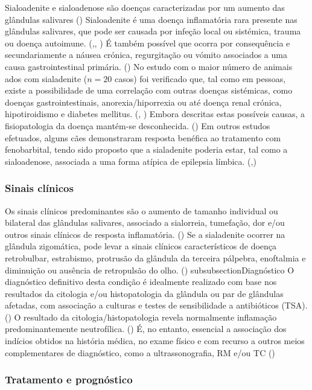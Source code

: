 Sialoadenite e sialoadenose são doenças caracterizadas por um aumento das glândulas salivares (\cite{Enache2025}) Sialoadenite é uma doença inflamatória rara presente nas glândulas salivares, que pode ser causada por infeção local ou sistémica, trauma ou doença autoimune. (\cite{supurativa},\cite{11cases}, \cite{sialadenite}) É também possível que ocorra por consequência e secundariamente a náusea crónica, regurgitação ou vómito associados a uma causa gastrointestinal primária. (\cite{McGill2009}) No estudo com o maior número de animais \cite{Kumar2017}ados com sialadenite ($n=20$ casos) foi verificado que, tal como em pessoas, existe a possibilidade de uma correlação com outras doenças sistémicas, como doenças gastrointestinais, anorexia/hiporrexia ou até doença renal crónica, hipotiroidismo e diabetes mellitus. (\cite{11cases}, \cite{Enache2025}) Embora descritas estas possíveis causas, a fisiopatologia da doença mantém-se desconhecida. (\cite{sialadenite}) Em outros estudos  efetuados, alguns cães demonstraram resposta benéfica ao tratamento com fenobarbital, tendo sido proposto que a sialadenite   poderia estar, tal como a sialoadenose, associada a uma forma atípica de epilepsia límbica. (\cite{Martinez2018},\cite{Park2022}) 
\subsubsection{Sinais clínicos}
Os sinais clínicos predominantes são o aumento de tamanho individual ou bilateral das glândulas salivares, associado a sialorreia, tumefação, dor e/ou outros sinais clínicos de resposta inflamatória. (\cite{McGill2009}) Se a sialadenite ocorrer na glândula zigomática, pode levar a sinais clínicos característicos de doença retrobulbar, estrabismo, protrusão da glândula da terceira pálpebra, enoftalmia e diminuição ou ausência de retropulsão do olho. (\cite{11cases})
subsubsection{Diagnóstico}
O diagnóstico definitivo desta condição é idealmente realizado com base nos resultados da citologia e/ou histopatologia da glândula ou par de glândulas afetadas, com associação a culturas e testes de sensibilidade a antibióticos (TSA). (\cite{Enache2025}) O resultado da citologia/histopatologia   revela normalmente inflamação predominantemente neutrofílica. (\cite{Enache2025}) É, no entanto, essencial a associação dos indícios obtidos na história médica, no exame físico e com recurso a outros meios complementares de diagnóstico, como a ultrassonografia, RM e/ou TC  (\cite{Enache2025})

\subsubsection{Tratamento e prognóstico}

